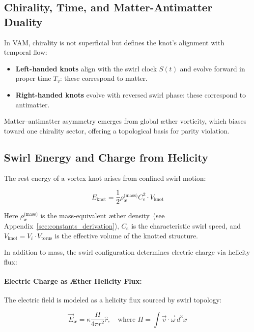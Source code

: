 \documentclass[12pt]{article}
\begin{document}
    \subsection{Chirality, Time, and Matter-Antimatter Duality}

    In VAM, chirality is not superficial but defines the knot’s alignment with temporal flow:

    \begin{itemize}
        \item \textbf{Left-handed knots} align with the swirl clock \( S(t) \) and evolve forward in proper time \( T_v \): these correspond to matter.
        \item \textbf{Right-handed knots} evolve with reversed swirl phase: these correspond to antimatter.
    \end{itemize}

    Matter–antimatter asymmetry emerges from global æther vorticity, which biases toward one chirality sector, offering a topological basis for parity violation.

    \subsection{Swirl Energy and Charge from Helicity}

    The rest energy of a vortex knot arises from confined swirl motion:

    \begin{equation}
    E_{\text{knot}} = \frac{1}{2} \rho_{\text{\ae}}^{\text{(mass)}} C_e^2 \cdot V_{\text{knot}}
    \label{eq:raw_swirl_energy}
    \end{equation}

    Here \( \rho_{\text{\ae}}^{\text{(mass)}} \) is the mass-equivalent æther density~(see Appendix~\ref{sec:constants_derivation}), \( C_e \) is the characteristic swirl speed, and \( V_{\text{knot}} = V_i \cdot V_{\text{torus}} \) is the effective volume of the knotted structure.

    In addition to mass, the swirl configuration determines electric charge via helicity flux:

    \paragraph{Electric Charge as Æther Helicity Flux:}

    The electric field is modeled as a helicity flux sourced by swirl topology:

    \begin{equation}
        \vec{E}_{\text{\ae}} = \kappa \frac{H}{4\pi r^2} \hat{r}, \quad \text{where } H = \int \vec{v} \cdot \vec{\omega} \, d^3x
    \end{equation}
\end{document}
